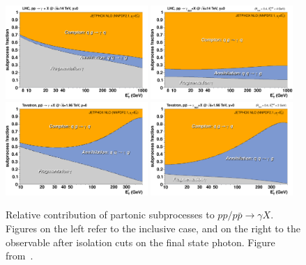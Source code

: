 \begin{figure}[ht]
\centering
\includegraphics[width=0.48\textwidth]{3-PDFdet/figs/subproc_ppgamma_jetphox_lhc_inc_stack.pdf}
\includegraphics[width=0.48\textwidth]{3-PDFdet/figs/subproc_ppgamma_jetphox_lhc_is_stack.pdf}\\
\includegraphics[width=0.48\textwidth]{3-PDFdet/figs/subproc_ppgamma_jetphox_tevatron_inc_stack.pdf}
\includegraphics[width=0.48\textwidth]{3-PDFdet/figs/subproc_ppgamma_jetphox_tevatron_is_stack.pdf}
\caption[Relative contribution of partonic subprocesses to $pp/p\bar{p}\to \gamma X$]{Relative contribution of partonic subprocesses to $pp/p\bar{p}\to \gamma X$. Figures on the left refer to the inclusive case, and on the right to the observable after isolation cuts on the final state photon. Figure from~\cite{dEnterria:2012yj}. }
\label{fig:jrpromptphoton}
\end{figure}

